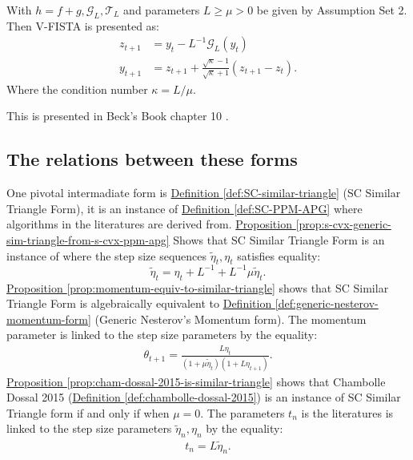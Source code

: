 \documentclass[12pt]{article}
\begin{document}
        \begin{definition}[V-FISTA]\label{def:v-fista}
            With $h = f + g, \mathcal G_L, \mathcal T_L$ and parameters $L \ge \mu > 0$  be given by Assumption Set 2. 
            Then V-FISTA is presented as: 
            \begin{align*}
                z_{t + 1} 
                &= y_t - L^{-1}\mathcal G_L(y_t)
                \\
                y_{t + 1} &= z_{t + 1} + 
                \frac{\sqrt{\kappa} - 1}{\sqrt{\kappa} + 1}
                (z_{t +1} - z_t). 
            \end{align*}
            Where the condition number $\kappa = L/\mu$. 
        \end{definition}
        \begin{remark}
            This is presented in Beck's Book chapter 10 \cite[(10.7.7)]{beck_first-order_nodate}. 
        \end{remark}

    \subsection{The relations between these forms}
        One pivotal intermadiate form is 
        \hyperref[def:SC-similar-triangle]
        { Definition \ref*{def:SC-similar-triangle}} 
        (SC Similar Triangle Form), it is an instance of
        \hyperref[def:SC-PPM-APG]
        {Definition \ref*{def:SC-PPM-APG}}
        where algorithms in the literatures are derived from. 
        \hyperref[prop:s-cvx-generic-sim-triangle-from-s-cvx-ppm-apg]
        {Proposition \ref*{prop:s-cvx-generic-sim-triangle-from-s-cvx-ppm-apg}}
        Shows that SC Similar Triangle Form is an instance of \SCPPMAPG where the step size sequences $\tilde \eta_t, \eta_t$ satisfies equality: 
        $$
            \tilde \eta_t =\eta_t + L^{-1} + L^{-1}\mu \tilde \eta_t. 
        $$
        \hyperref[prop:momentum-equiv-to-similar-triangle]
        {Proposition \ref*{prop:momentum-equiv-to-similar-triangle}}
        shows that SC Similar Triangle Form is algebraically equivalent to 
        \hyperref[def:generic-nesterov-momentum-form]{Definition \ref*{def:generic-nesterov-momentum-form}} (Generic Nesterov's Momentum form).
        The momentum parameter is linked to the step size parameters by the equality: 
        \begin{align*}
            \theta_{t + 1} = \frac{L\eta_t}{(1 + \mu \tilde\eta_{t})(1 + L\eta_{t + 1})}.
        \end{align*} 
        \hyperref[prop:cham-dossal-2015-is-similar-triangle]
        {Proposition \ref{prop:cham-dossal-2015-is-similar-triangle}}
        shows that Chambolle Dossal 2015 (\hyperref[def:chambolle-dossal-2015]
            {Definition \ref*{def:chambolle-dossal-2015}})
        is an instance of SC Similar Triangle form if and only if when $\mu = 0$. 
        The parameters $t_n$ is the literatures is linked to the step size parameters $\tilde \eta_n, \eta_n$ by the equality: 
        \begin{align*}
            t_n = L \tilde \eta_n. 
        \end{align*}
\end{document}
